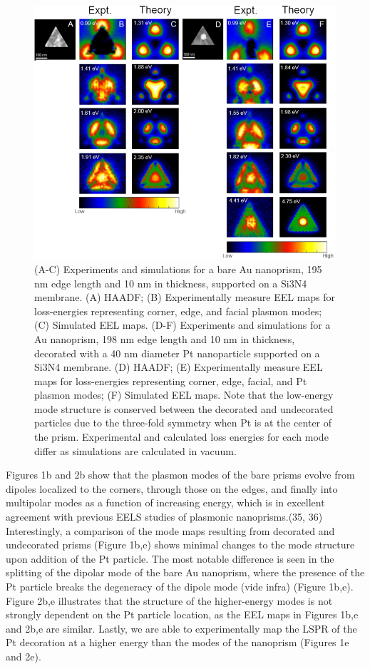 \documentclass [11pt, proquest] {uwthesis}[2016/11/22]
\begin{document}
\begin{figure}
\includegraphics{prisms_mode_maps_center.png}
\caption{(A-C) Experiments and simulations for a bare Au nanoprism, 195 nm edge length and 10 nm in thickness, supported on a Si3N4 membrane. (A) HAADF; (B) Experimentally measure EEL maps for loss-energies representing corner, edge, and facial plasmon modes; (C) Simulated EEL maps. (D-F) Experiments and simulations for a Au nanoprism, 198 nm edge length and 10 nm in thickness, decorated with a 40 nm diameter Pt nanoparticle supported on a Si3N4 membrane. (D) HAADF; (E) Experimentally measure EEL maps for loss-energies representing corner, edge, facial, and Pt plasmon modes; (F) Simulated EEL maps. Note that the low-energy mode structure is conserved between the decorated and undecorated particles due to the three-fold symmetry when Pt is at the center of the prism. Experimental and calculated loss energies for each mode differ as simulations are calculated in vacuum.}
\label{modes_center}
\end{figure}


Figures 1b and 2b show that the plasmon modes of the bare prisms evolve from dipoles localized to the corners, through those on the edges, and finally into multipolar modes as a function of increasing energy, which is in excellent agreement with previous EELS studies of plasmonic nanoprisms.(35, 36) Interestingly, a comparison of the mode maps resulting from decorated and undecorated prisms (Figure 1b,e) shows minimal changes to the mode structure upon addition of the Pt particle. The most notable difference is seen in the splitting of the dipolar mode of the bare Au nanoprism, where the presence of the Pt particle breaks the degeneracy of the dipole mode (vide infra) (Figure 1b,e). Figure 2b,e illustrates that the structure of the higher-energy modes is not strongly dependent on the Pt particle location, as the EEL maps in Figures 1b,e and 2b,e are similar. Lastly, we are able to experimentally map the LSPR of the Pt decoration at a higher energy than the modes of the nanoprism (Figures 1e and 2e).
\end{document}
